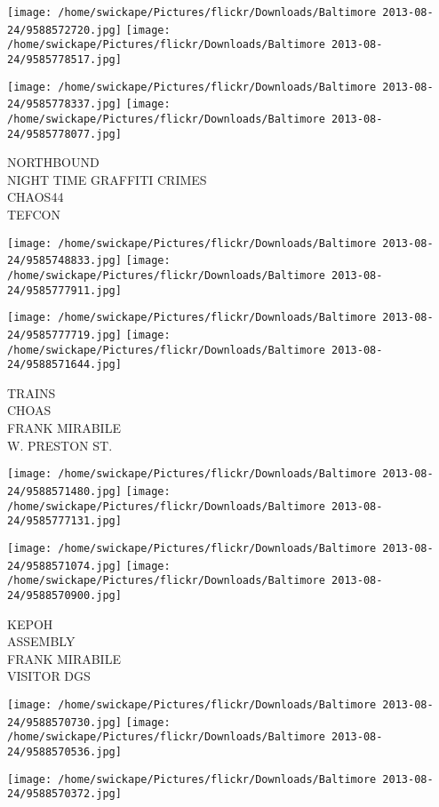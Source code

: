 \documentclass[10pt,letterpaper]{article}
\begin{document}
\texttt{[image: /home/swickape/Pictures/flickr/Downloads/Baltimore 2013-08-24/9588572720.jpg]}
\texttt{[image: /home/swickape/Pictures/flickr/Downloads/Baltimore 2013-08-24/9585778517.jpg]}

\texttt{[image: /home/swickape/Pictures/flickr/Downloads/Baltimore 2013-08-24/9585778337.jpg]}
\texttt{[image: /home/swickape/Pictures/flickr/Downloads/Baltimore 2013-08-24/9585778077.jpg]}

NORTHBOUND\\
NIGHT TIME GRAFFITI CRIMES\\
CHAOS44\\
TEFCON
\pagebreak

\texttt{[image: /home/swickape/Pictures/flickr/Downloads/Baltimore 2013-08-24/9585748833.jpg]}
\texttt{[image: /home/swickape/Pictures/flickr/Downloads/Baltimore 2013-08-24/9585777911.jpg]}

\texttt{[image: /home/swickape/Pictures/flickr/Downloads/Baltimore 2013-08-24/9585777719.jpg]}
\texttt{[image: /home/swickape/Pictures/flickr/Downloads/Baltimore 2013-08-24/9588571644.jpg]}

TRAINS\\
CHOAS\\
FRANK MIRABILE\\
W. PRESTON ST.
\pagebreak

\texttt{[image: /home/swickape/Pictures/flickr/Downloads/Baltimore 2013-08-24/9588571480.jpg]}
\texttt{[image: /home/swickape/Pictures/flickr/Downloads/Baltimore 2013-08-24/9585777131.jpg]}

\texttt{[image: /home/swickape/Pictures/flickr/Downloads/Baltimore 2013-08-24/9588571074.jpg]}
\texttt{[image: /home/swickape/Pictures/flickr/Downloads/Baltimore 2013-08-24/9588570900.jpg]}

KEPOH\\
ASSEMBLY\\
FRANK MIRABILE\\
VISITOR DGS
\pagebreak

\texttt{[image: /home/swickape/Pictures/flickr/Downloads/Baltimore 2013-08-24/9588570730.jpg]}
\texttt{[image: /home/swickape/Pictures/flickr/Downloads/Baltimore 2013-08-24/9588570536.jpg]}

\vspace{0.25in}
\texttt{[image: /home/swickape/Pictures/flickr/Downloads/Baltimore 2013-08-24/9588570372.jpg]}
\end{document}
